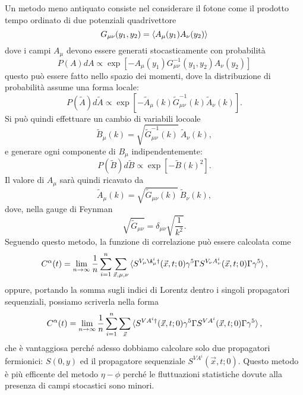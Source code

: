 \documentclass[LaM]{sapthesis}
\begin{document}
	Un metodo meno antiquato consiste nel considerare il fotone come il prodotto tempo ordinato di due potenziali quadrivettore
	\begin{equation*}
		G_{\mu\nu}(y_1,y_2)=\braket{A_\mu(y_1)A_\nu(y_2)}
	\end{equation*}
	dove i campi $A_\mu$ devono essere generati stocasticamente con probabilità
	\begin{equation*}
		P(A)dA\propto\exp{[-A_\mu(y_1) G^{-1}_{\mu\nu}(y_1,y_2)A_\nu(y_2)]}
	\end{equation*}
	questo può essere fatto nello spazio dei momenti, dove la distribuzione di probabilità assume una forma locale:
	\begin{equation*}
		P(\tilde{A})d\tilde{A}\propto\exp{[-\tilde{A}_\mu(k) \tilde{G}^{-1}_{\mu\nu}(k)\tilde{A}_\nu(k)]}.
	\end{equation*}
	Si può quindi effettuare un cambio di variabili locoale
	\begin{equation*}
		\tilde{B}_\mu(k)=\sqrt{\tilde{G}^{-1}_{\mu\nu}(k)} \ \tilde{A}_\nu(k),
	\end{equation*}
	 e generare ogni componente di $B_\mu$ indipendentemente:
	 \begin{equation*}
	 	P(\tilde{B})d\tilde{B}\propto\exp[-\tilde{B}(k)^2].
	 \end{equation*}
	Il valore di $A_\mu$ sarà quindi ricavato da
	\begin{equation*}
		\tilde{A}_\mu(k)=\sqrt{\tilde{G}_{\mu\nu}(k)} \ \tilde{B}_\nu(k),
	\end{equation*}
	dove, nella gauge di Feynman
	\begin{equation*}
		\sqrt{\tilde{G}_{\mu\nu}}=\delta_{\mu\nu}\sqrt{\frac{1}{k^2}}.
	\end{equation*}
	Seguendo questo metodo, la funzione di correlazione può essere calcolata come
	\begin{equation}
	C^\alpha(t)=\lim_{n\to\infty}\frac{1}{n}\sum_{i=1}^{n}\sum_{\vec{x},\mu,\nu} \braket{S^{V_\mu\A_\mu^i\dagger}(\vec{x},t;0)\gamma^5\Gamma S^{V_\nu A^i_\nu}(\vec{x},t;0)\Gamma\gamma^5},
	\end{equation}
	oppure, portando la somma sugli indici di Lorentz dentro i singoli propagatori sequenziali, possiamo scriverla nella forma
	\begin{equation}
	C^\alpha(t)=\lim_{n\to\infty}\frac{1}{n}\sum_{i=1}^{n}\sum_{\vec{x}} \braket{S^{VA^i\dagger}(\vec{x},t;0)\gamma^5\Gamma S^{VA^i}(\vec{x},t;0)\Gamma\gamma^5},
	\end{equation}
	che è vantaggiosa perché adesso dobbiamo calcolare solo due propagatori fermionici: $S(0,y)$ ed il propagatore sequenziale $S^{VA^i}(\vec{x},t;0)$. Questo metodo è più efficente del metodo $\eta-\phi$ \color{red}perché le fluttuazioni statistiche dovute alla presenza di campi stocastici sono minori\color{black}.
\end{document}
